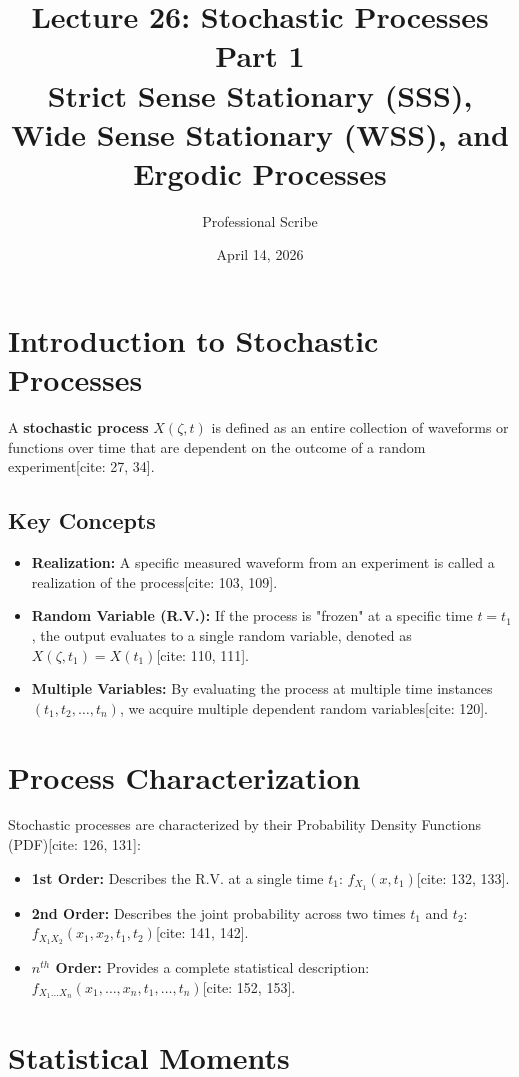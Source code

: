 \documentclass[11pt]{article}
\title{\textbf{Lecture 26: Stochastic Processes Part 1} \\ \large Strict Sense Stationary (SSS), Wide Sense Stationary (WSS), and Ergodic Processes}
\author{Professional Scribe}
\date{April 14, 2026}
\begin{document}
\maketitle

\section{Introduction to Stochastic Processes}
A \textbf{stochastic process} $X(\zeta, t)$ is defined as an entire collection of waveforms or functions over time that are dependent on the outcome of a random experiment[cite: 27, 34]. 

\subsection{Key Concepts}
\begin{itemize}
    \item \textbf{Realization:} A specific measured waveform from an experiment is called a realization of the process[cite: 103, 109].
    \item \textbf{Random Variable (R.V.):} If the process is "frozen" at a specific time $t = t_1$, the output evaluates to a single random variable, denoted as $X(\zeta, t_1) = X(t_1)$[cite: 110, 111].
    \item \textbf{Multiple Variables:} By evaluating the process at multiple time instances $(t_1, t_2, \dots, t_n)$, we acquire multiple dependent random variables[cite: 120].
\end{itemize}

\section{Process Characterization}
Stochastic processes are characterized by their Probability Density Functions (PDF)[cite: 126, 131]:
\begin{itemize}
    \item \textbf{1st Order:} Describes the R.V. at a single time $t_1$: $f_{X_1}(x, t_1)$[cite: 132, 133].
    \item \textbf{2nd Order:} Describes the joint probability across two times $t_1$ and $t_2$: $f_{X_1X_2}(x_1, x_2, t_1, t_2)$[cite: 141, 142].
    \item \textbf{$n^{th}$ Order:} Provides a complete statistical description: $f_{X_1\dots X_n}(x_1, \dots, x_n, t_1, \dots, t_n)$[cite: 152, 153].
\end{itemize}

\section{Statistical Moments}
\end{document}
